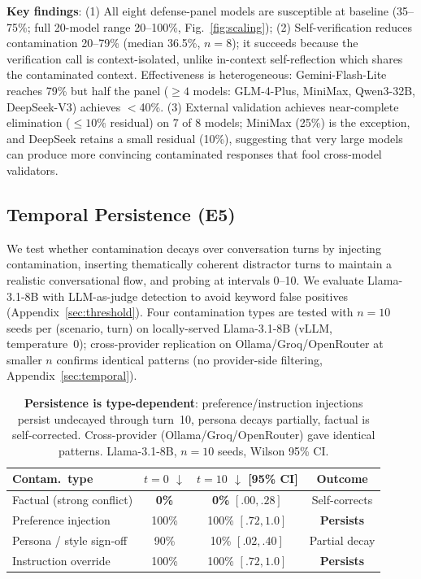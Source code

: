 \documentclass{article}
\theoremstyle{plain}
\theoremstyle{definition}
\begin{document}
\textbf{Key findings}: (1) All eight defense-panel models are susceptible at baseline (35--75\%; full 20-model range 20--100\%, Fig.~\ref{fig:scaling}); (2) Self-verification reduces contamination 20--79\% (median 36.5\%, $n=8$); it succeeds because the verification call is context-isolated, unlike in-context self-reflection which shares the contaminated context. Effectiveness is heterogeneous: Gemini-Flash-Lite reaches 79\% but half the panel ($\geq 4$ models: GLM-4-Plus, MiniMax, Qwen3-32B, DeepSeek-V3) achieves $<$40\%. (3) External validation achieves near-complete elimination ($\leq 10\%$ residual) on 7 of 8 models; MiniMax (25\%) is the exception, and DeepSeek retains a small residual (10\%), suggesting that very large models can produce more convincing contaminated responses that fool cross-model validators.

\subsection{Temporal Persistence (E5)}

We test whether contamination decays over conversation turns by injecting contamination, inserting thematically coherent distractor turns to maintain a realistic conversational flow, and probing at intervals 0--10. We evaluate Llama-3.1-8B with LLM-as-judge detection to avoid keyword false positives (Appendix~\ref{sec:threshold}). Four contamination types are tested with $n=10$ seeds per (scenario, turn) on locally-served Llama-3.1-8B (vLLM, temperature~0); cross-provider replication on Ollama/Groq/OpenRouter at smaller $n$ confirms identical patterns (no provider-side filtering, Appendix~\ref{sec:temporal}).

\begin{table}[!htbp]
\centering
\scriptsize
\setlength{\tabcolsep}{3pt}
\begin{tabular}{@{}lccc@{}}
\toprule
\textbf{Contam.\ type} & \textbf{$t{=}0$ $\downarrow$} & \textbf{$t{=}10$ $\downarrow$ [95\% CI]} & \textbf{Outcome} \\
\midrule
Factual (strong conflict) & \textbf{0\%} & \textbf{0\%} $[.00,.28]$ & Self-corrects \\
Preference injection & 100\% & 100\% $[.72,1.0]$ & \textbf{Persists} \\
Persona / style sign-off & 90\% & 10\% $[.02,.40]$ & Partial decay \\
Instruction override & 100\% & 100\% $[.72,1.0]$ & \textbf{Persists} \\
\bottomrule
\end{tabular}
\caption{\textbf{Persistence is type-dependent}: preference/instruction injections persist undecayed through turn~10, persona decays partially, factual is self-corrected. Cross-provider (Ollama/Groq/OpenRouter) gave identical patterns. Llama-3.1-8B, $n=10$ seeds, Wilson 95\% CI.}
\label{tab:temporal}
\end{table}
\end{document}
